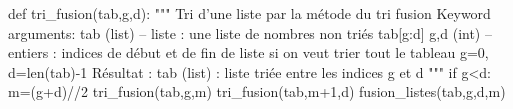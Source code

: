\documentclass[10pt,fleqn]{article} %
\newcommand{\tsf}[1]{\small{\texttt{#1}}}
\begin{document}
\begin{py}
\begin{python}        
def tri_fusion(tab,g,d):
    """
    Tri d'une liste par la métode du tri fusion
    Keyword arguments:
    tab (list) -- liste : une liste de nombres non triés tab[g:d]
    g,d (int) -- entiers : indices de début et de fin de liste si on veut trier
      tout le tableau g=0, d=len(tab)-1
    Résultat :
    tab (list) : liste triée entre les indices g et d
    """
    if g<d:
        m=(g+d)//2
        tri_fusion(tab,g,m)
        tri_fusion(tab,m+1,d)
        fusion_listes(tab,g,d,m)
\end{python}
\end{py}
\end{document}

